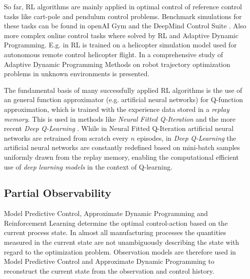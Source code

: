 So far, RL algorithms are mainly applied in optimal control of reference control tasks like cart-pole and pendulum control problems. Benchmark simulations for these tasks can be found in openAI Gym \cite{Brockman2016} and the DeepMind Control Suite \cite{tassa2018deepmind}. Also more complex online control tasks where solved by RL and Adaptive Dynamic Programming. E.g. in \cite{ng2006autonomous} RL is trained on a helicopter simulation model used for autonomous remote control helicopter flight. In \cite{Szuster2018} a comprehensive study of Adaptive Dynamic Programming Methods on robot trajectory optimization problems in unknown environments is presented. 

The fundamental basis of many successfully applied RL algorithms is the use of an general function approximator (e.g. artificial neural networks) for Q-function approximation, which is trained with the experience data stored in a \textit{replay memory}. This is used in methods like \textit{Neural Fitted Q-Iteration} \cite{Riedmiller2005} and the more recent \textit{Deep Q-Learning} \cite{mnih2015human}. While in Neural Fitted Q-Iteration artificial neural networks are retrained from scratch every $n$ episodes, in \textit{Deep Q-Learning} the artificial neural networks are constantly redefined based on mini-batch samples uniformly drawn from the replay memory, enabling the computational efficient use of \textit{deep learning models} in the context of Q-learning.

\subsection{Partial Observability}
\label{introPartobs}

Model Predictive Control, Approximate Dynamic Programming and Reinforcement Learning determine the optimal control-action based on the current process state. In almost all manufacturing processes the quantities measured in the current state are not unambiguously describing the state with regard to the optimization problem. Observation models are therefore used in Model Predictive Control and Approximate Dynamic Programming to reconstruct the current state from the observation and control history.

